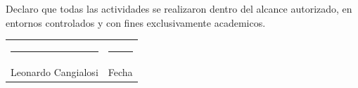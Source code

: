 \documentclass[11pt,a4paper]{article}
\begin{document}
\begin{campo}
Declaro que todas las actividades se realizaron dentro del alcance autorizado, en entornos controlados y con fines exclusivamente academicos.\\[0.4cm]
\begin{tabularx}{\textwidth}{@{} X X @{}}
\rule{6cm}{0.4pt} & \rule{6cm}{0.4pt} \\
Leonardo Cangialosi & Fecha \\
\end{tabularx}
\end{campo}
\end{document}
